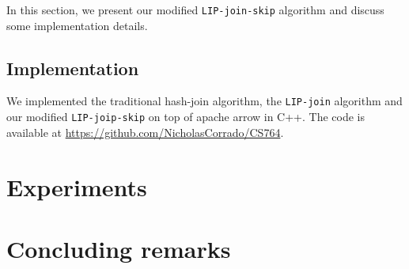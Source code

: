 \documentclass[11pt]{article}
\begin{document}
In this section, we present our modified \texttt{LIP-join-skip} algorithm and discuss some implementation details.

\subsection{Implementation}

We implemented the traditional hash-join algorithm, the \texttt{LIP-join} algorithm and our modified \texttt{LIP-joip-skip} on top of apache arrow in C++. The code is available at \url{https://github.com/NicholasCorrado/CS764}.


\section{Experiments}


\section{Concluding remarks}




{}

\end{document}
